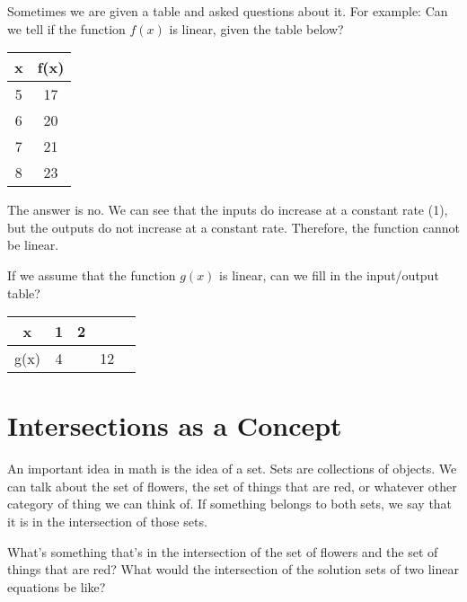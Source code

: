\begin{example}

Sometimes we are given a table and asked questions about it. For example: Can we tell if the function $f(x)$ is linear, given the table below?
\begin{center}
\begin{tabular}{|c|c|}
\hline
	x & f(x) \\
	\hline
	5 & 17 \\ 
	\hline
	6 & 20 \\
	\hline
	7 & 21 \\ 
	\hline
	8 & 23 \\
	\hline 
\end{tabular}
\end{center}

The answer is no. We can see that the inputs do increase at a constant rate (1), but the outputs do not increase at a constant rate. Therefore, the function cannot be linear.
\end{example}

\begin{prblm}
	If we assume that the function $g(x)$ is linear, can we fill in the input/output table?
	
		\begin{center}
	 \begin{tabular}{|c|c|c|c|c|}
\hline
	x & 1&2 &  &  \hspace{.5cm} \\
	\hline
	g(x) & 4 &  & 12 &  \\
	\hline
\end{tabular}
\end{center}

\end{prblm}
	
\section{Intersections as a Concept}

An important idea in math is the idea of a set.  Sets are collections of objects.  We can talk about the set of flowers, the set of things that are red, or whatever other category of thing we can think of.  If something belongs to both sets, we say that it is in the intersection of those sets.


\begin{prblm}
What's something that's in the intersection of the set of flowers and the set of things that are red?
What would the intersection of the solution sets of two linear equations be like?
\vspace{5cm}
\end{prblm}


